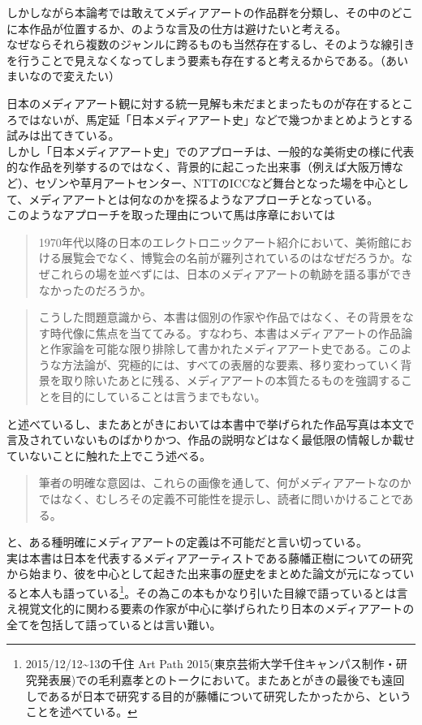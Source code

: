 \documentclass[a4paper,report]{jsbook}
\begin{document}
しかしながら本論考では敢えてメディアアートの作品群を分類し、その中のどこに本作品が位置するか、のような言及の仕方は避けたいと考える。\\
なぜならそれら複数のジャンルに跨るものも当然存在するし、そのような線引きを行うことで見えなくなってしまう要素も存在すると考えるからである。（あいまいなので変えたい）

日本のメディアアート観に対する統一見解も未だまとまったものが存在するところではないが、馬定延「日本メディアアート史」などで幾つかまとめようとする試みは出てきている。\\
しかし「日本メディアアート史」でのアプローチは、一般的な美術史の様に代表的な作品を列挙するのではなく、背景的に起こった出来事（例えば大阪万博など）、セゾンや草月アートセンター、NTTのICCなど舞台となった場を中心として、メディアアートとは何なのかを探るようなアプローチとなっている。\\
このようなアプローチを取った理由について馬は序章においては

\begin{quote}
1970年代以降の日本のエレクトロニックアート紹介において、美術館における展覧会でなく、博覧会の名前が羅列されているのはなぜだろうか。なぜこれらの場を並べずには、日本のメディアアートの軌跡を語る事ができなかったのだろうか。
\end{quote}

\begin{quote}
こうした問題意識から、本書は個別の作家や作品ではなく、その背景をなす時代像に焦点を当ててみる。すなわち、本書はメディアアートの作品論と作家論を可能な限り排除して書かれたメディアアート史である。このような方法論が、究極的には、すべての表層的な要素、移り変わっていく背景を取り除いたあとに残る、メディアアートの本質たるものを強調することを目的にしていることは言うまでもない。
\end{quote}

と述べているし、またあとがきにおいては本書中で挙げられた作品写真は本文で言及されていないものばかりかつ、作品の説明などはなく最低限の情報しか載せていないことに触れた上でこう述べる。

\begin{quote}
筆者の明確な意図は、これらの画像を通して、何がメディアアートなのかではなく、むしろその定義不可能性を提示し、読者に問いかけることである。
\end{quote}

と、ある種明確にメディアアートの定義は不可能だと言い切っている。\\
実は本書は日本を代表するメディアアーティストである藤幡正樹についての研究から始まり、彼を中心として起きた出来事の歴史をまとめた論文が元になっていると本人も語っている\footnote{2015/12/12\textasciitilde{}13の千住
  Art Path
  2015(東京芸術大学千住キャンパス制作・研究発表展)での毛利嘉孝とのトークにおいて。またあとがきの最後でも遠回しであるが日本で研究する目的が藤幡について研究したかったから、ということを述べている。}。その為この本もかなり引いた目線で語っているとは言え視覚文化的に関わる要素の作家が中心に挙げられたり日本のメディアアートの全てを包括して語っているとは言い難い。
\end{document}

